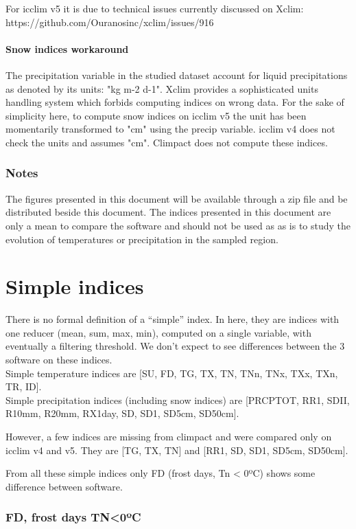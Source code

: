 \documentclass[a4paper,11pt]{article}
\begin{document}
    For icclim v5 it is due to technical issues currently discussed on Xclim: https://github.com/Ouranosinc/xclim/issues/916
\subsection{Snow indices workaround}
    The precipitation variable in the studied dataset account for liquid precipitations as denoted by its units: "kg m-2 d-1".
    Xclim provides a sophisticated units handling system which forbids computing indices on wrong data. For the sake of simplicity here, to compute snow indices on icclim v5 the unit has been momentarily transformed to "cm" using the precip variable.
    icclim v4 does not check the units and assumes "cm".
    Climpact does not compute these indices.
\section{Notes}
    The figures presented in this document will be available through a zip file and be distributed beside this document.
    The indices presented in this document are only a mean to compare the software and should not be used as as is to study the evolution of temperatures or precipitation in the sampled region.



\part{Simple indices}
    There is no formal definition of a “simple” index. In here, they are indices with one reducer (mean, sum, max, min), computed on a single variable, with eventually a filtering threshold. We don’t expect to see differences between the 3 software on these indices.\\
    Simple temperature indices are [SU, FD, TG, TX, TN, TNn, TNx, TXx, TXn, TR, ID].\\
    Simple precipitation indices (including snow indices) are [PRCPTOT, RR1, SDII, R10mm, R20mm, RX1day, SD, SD1, SD5cm, SD50cm].

    However, a few indices are missing from climpact and were compared only on icclim v4 and v5. They are [TG, TX, TN] and [RR1, SD, SD1, SD5cm, SD50cm].

    From all these simple indices only FD (frost days, Tn < 0ºC) shows some difference between software.

\section{FD, frost days TN<0ºC}
\end{document}
